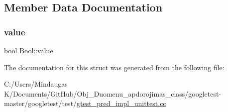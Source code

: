\subsection{Member Data Documentation}
\mbox{\label{struct_bool_a16be863c269f988cdcbe59f9d846a141}} 
\subsubsection{\texorpdfstring{value}{value}}
{\footnotesize\ttfamily bool Bool\+::value}



The documentation for this struct was generated from the following file\+:\begin{DoxyCompactItemize}
\item 
C\+:/\+Users/\+Mindaugas K/\+Documents/\+Git\+Hub/\+Obj\+\_\+\+Duomenu\+\_\+apdorojimas\+\_\+class/googletest-\/master/googletest/test/\mbox{\hyperlink{googletest-master_2googletest_2test_2gtest__pred__impl__unittest_8cc}{gtest\+\_\+pred\+\_\+impl\+\_\+unittest.\+cc}}\end{DoxyCompactItemize}
